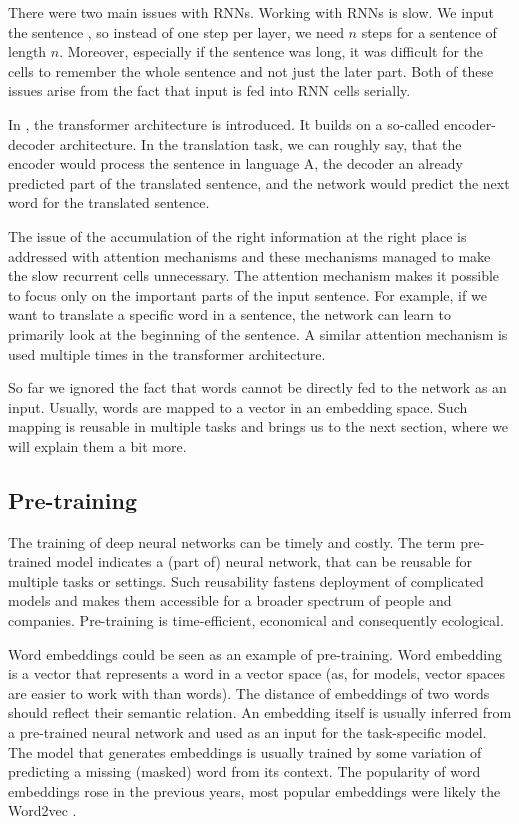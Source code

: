 There were two main issues with RNNs. Working with RNNs is slow. We input the sentence , so instead of one step per layer, we need $n$ steps for a sentence of length $n$. Moreover, especially if the sentence was long, it was difficult for the cells to remember the whole sentence and not just the later part. Both of these issues arise from the fact that input is fed into RNN cells serially. 

In \cite{vaswani2017attention}, the transformer architecture is introduced. It builds on a so-called encoder-decoder architecture. In the translation task, we can roughly say, that the encoder would process the sentence in language A, the decoder an already predicted part of the translated sentence, and the network would predict the next word for the translated sentence.

The issue of the accumulation of the right information at the right place is addressed with attention mechanisms and these mechanisms managed to make the slow recurrent cells unnecessary. The attention mechanism makes it possible to focus only on the important parts of the input sentence. For example, if we want to translate a specific word in a sentence, the network can learn to primarily look at the beginning of the sentence. A similar attention mechanism is used multiple times in the transformer architecture. 

So far we ignored the fact that words cannot be directly fed to the network as an input. Usually, words are mapped to a vector in an embedding space. Such mapping is reusable in multiple tasks and brings us to the next section, where we will explain them a bit more.
 
\subsection{Pre-training}

The training of deep neural networks can be timely and costly. The term pre-trained model indicates a (part of) neural network, that can be reusable for multiple tasks or settings. Such reusability fastens deployment of complicated models and makes them accessible for a broader spectrum of people and companies. Pre-training is time-efficient, economical and consequently ecological.

Word embeddings could be seen as an example of pre-training. Word embedding is a vector that represents a word in a vector space (as, for models, vector spaces are easier to work with than words). The distance of embeddings of two words should reflect their semantic relation. An embedding itself is usually inferred from a pre-trained neural network and used as an input for the task-specific model. The model that generates embeddings is usually trained by some variation of predicting a missing (masked) word from its context. The popularity of word embeddings rose in the previous years, most popular embeddings were likely the Word2vec \cite{mikolov2013word2vec}.  

